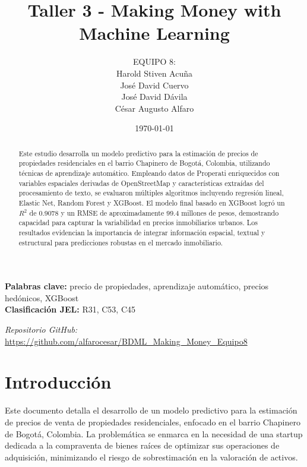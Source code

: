 \documentclass[12pt,a4paper,onecolumn]{article}
\title{\textbf{Taller 3 - Making Money with Machine Learning}}
\author{%
\begin{center}
EQUIPO 8:\\
Harold Stiven Acuña\\
José David Cuervo\\
José David Dávila\\
César Augusto Alfaro
\end{center}%
}
\date{\today}
\begin{document}
\maketitle
\thispagestyle{empty}


\begin{abstract}
Este estudio desarrolla un modelo predictivo para la estimación de precios de propiedades residenciales en el barrio Chapinero de Bogotá, Colombia, utilizando técnicas de aprendizaje automático. Empleando datos de Properati enriquecidos con variables espaciales derivadas de OpenStreetMap y características extraídas del procesamiento de texto, se evaluaron múltiples algoritmos incluyendo regresión lineal, Elastic Net, Random Forest y XGBoost. El modelo final basado en XGBoost logró un $R^2$ de 0.9078 y un RMSE de aproximadamente 99.4 millones de pesos, demostrando capacidad para capturar la variabilidad en precios inmobiliarios urbanos. Los resultados evidencian la importancia de integrar información espacial, textual y estructural para predicciones robustas en el mercado inmobiliario.
\end{abstract}

\medskip

\begin{flushleft}
    {\bf Palabras clave:} precio de propiedades, aprendizaje automático, precios hedónicos, XGBoost \\
    {\bf Clasificación JEL:} R31, C53, C45
\end{flushleft}

\begin{center}
    \textit{Repositorio GitHub:} \url{https://github.com/alfarocesar/BDML_Making_Money_Equipo8}
\end{center}

\pagebreak
\singlespacing
\setlength{\parindent}{0pt}
\setlength{\parskip}{1em}


\section{Introducción}

Este documento detalla el desarrollo de un modelo predictivo para la estimación de precios de venta de propiedades residenciales, enfocado en el barrio Chapinero de Bogotá, Colombia. La problemática se enmarca en la necesidad de una startup dedicada a la compraventa de bienes raíces de optimizar sus operaciones de adquisición, minimizando el riesgo de sobrestimación en la valoración de activos.
\end{document}
